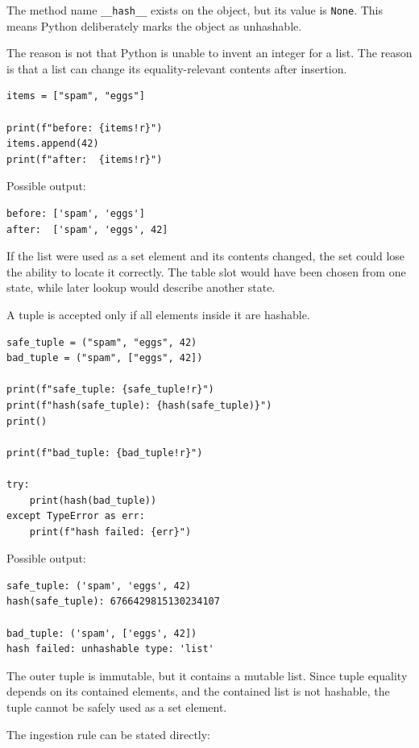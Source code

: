 The method name \texttt{\_\_hash\_\_} exists on the object, but its value is \texttt{None}. This means Python deliberately marks the object as unhashable.

The reason is not that Python is unable to invent an integer for a list. The reason is that a list can change its equality-relevant contents after insertion.

\begin{verbatim}
items = ["spam", "eggs"]

print(f"before: {items!r}")
items.append(42)
print(f"after:  {items!r}")
\end{verbatim}

Possible output:

\begin{verbatim}
before: ['spam', 'eggs']
after:  ['spam', 'eggs', 42]
\end{verbatim}

If the list were used as a set element and its contents changed, the set could lose the ability to locate it correctly. The table slot would have been chosen from one state, while later lookup would describe another state.

A tuple is accepted only if all elements inside it are hashable.

\begin{verbatim}
safe_tuple = ("spam", "eggs", 42)
bad_tuple = ("spam", ["eggs", 42])

print(f"safe_tuple: {safe_tuple!r}")
print(f"hash(safe_tuple): {hash(safe_tuple)}")
print()

print(f"bad_tuple: {bad_tuple!r}")

try:
    print(hash(bad_tuple))
except TypeError as err:
    print(f"hash failed: {err}")
\end{verbatim}

Possible output:

\begin{verbatim}
safe_tuple: ('spam', 'eggs', 42)
hash(safe_tuple): 6766429815130234107

bad_tuple: ('spam', ['eggs', 42])
hash failed: unhashable type: 'list'
\end{verbatim}

The outer tuple is immutable, but it contains a mutable list. Since tuple equality depends on its contained elements, and the contained list is not hashable, the tuple cannot be safely used as a set element.

The ingestion rule can be stated directly:

